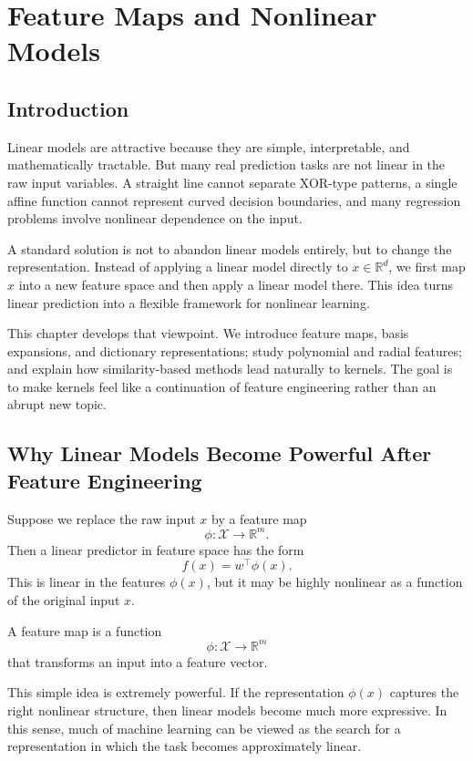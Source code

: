 \chapter{Feature Maps and Nonlinear Models}

\section{Introduction}

Linear models are attractive because they are simple, interpretable, and mathematically tractable. But many real prediction tasks are not linear in the raw input variables. A straight line cannot separate XOR-type patterns, a single affine function cannot represent curved decision boundaries, and many regression problems involve nonlinear dependence on the input.

A standard solution is not to abandon linear models entirely, but to change the representation. Instead of applying a linear model directly to $x\in\mathbb R^d$, we first map $x$ into a new feature space and then apply a linear model there. This idea turns linear prediction into a flexible framework for nonlinear learning.

This chapter develops that viewpoint. We introduce feature maps, basis expansions, and dictionary representations; study polynomial and radial features; and explain how similarity-based methods lead naturally to kernels. The goal is to make kernels feel like a continuation of feature engineering rather than an abrupt new topic.

\section{Why Linear Models Become Powerful After Feature Engineering}

Suppose we replace the raw input $x$ by a feature map
\[
\phi:\mathcal X \to \mathbb R^m.
\]
Then a linear predictor in feature space has the form
\[
f(x)=w^\top \phi(x).
\]
This is linear in the features $\phi(x)$, but it may be highly nonlinear as a function of the original input $x$.

\begin{definition}
A feature map is a function
\[
\phi:\mathcal X\to\mathbb R^m
\]
that transforms an input into a feature vector.
\end{definition}

This simple idea is extremely powerful. If the representation $\phi(x)$ captures the right nonlinear structure, then linear models become much more expressive. In this sense, much of machine learning can be viewed as the search for a representation in which the task becomes approximately linear.

